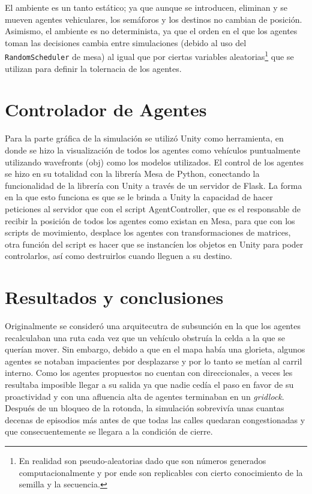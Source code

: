 \documentclass[twoside,11pt]{article}
\begin{document}
El ambiente es un tanto estático; ya que aunque se introducen, eliminan y se mueven agentes vehiculares,
los semáforos y los destinos no cambian de posición. Asimismo, el ambiente es no determinista, ya que
el orden en el que los agentes toman las decisiones cambia entre simulaciones (debido al uso del {\tt{RandomScheduler}} de 
mesa) al igual que por ciertas variables aleatorias\footnote{En realidad son pseudo-aleatorias dado que son números generados computacionalmente y por ende son replicables con cierto conocimiento de la semilla y la secuencia.} que se utilizan para definir la tolernacia de los agentes.

\section{Controlador de Agentes}
Para la parte gráfica de la simulación se utilizó Unity como herramienta, en donde se hizo la visualización de todos los agentes como vehículos puntualmente utilizando wavefronts (obj) como los modelos utilizados. 
El control de los agentes se hizo en su totalidad con la librería Mesa de Python, conectando la funcionalidad de la librería con Unity a través de un servidor de Flask. La forma en la que esto funciona es que se le brinda a 
Unity la capacidad de hacer peticiones al servidor que con el script AgentController, que es el responsable de recibir la posición de todos los agentes como existan en Mesa, para que con los scripts de movimiento, desplace los agentes 
con transformaciones de matrices, otra función del script es hacer que se instancíen los objetos en Unity para poder controlarlos, así como destruirlos cuando lleguen a su destino.

\section{Resultados y conclusiones}

Originalmente se consideró una arquitecutra de subsunción en la que los agentes recalculaban una ruta cada vez que un vehículo obstruía la celda
a la que se querían mover. Sin embargo, debido a que en el mapa había una glorieta, algunos agentes se notaban impacientes por desplazarse y por lo tanto se metían al
carril interno. Como los agentes propuestos no cuentan con direccionales, a veces les resultaba imposible llegar a su salida ya que nadie cedía el paso en favor de su proactividad
y con una afluencia alta de agentes terminaban en un \textit{gridlock}. Después de un bloqueo de la rotonda, la simulación sobrevivía unas cuantas decenas de episodios más antes de 
que todas las calles quedaran congestionadas y que consecuentemente se llegara a la condición de cierre.
\end{document}
